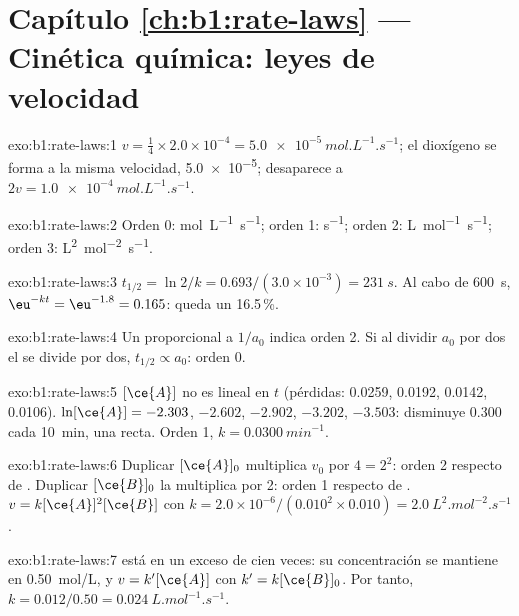 \section*{Capítulo \ref{ch:b1:rate-laws} --- Cinética química: leyes de velocidad}

\begin{solution}{exo:b1:rate-laws:1}
$v = \frac14 \times 2.0 \times 10^{-4} = \qty{5.0e-5}{mol.L^{-1}.s^{-1}}$;
el dioxígeno se forma a la misma velocidad, \qty{5.0e-5}{}; 
desaparece a
$2v = \qty{1.0e-4}{mol.L^{-1}.s^{-1}}$.
\end{solution}

\begin{solution}{exo:b1:rate-laws:2}
Orden 0: \unit{mol.L^{-1}.s^{-1}}; orden 1: \unit{s^{-1}}; orden 2:
\unit{L.mol^{-1}.s^{-1}}; orden 3: \unit{L^2.mol^{-2}.s^{-1}}.
\end{solution}

\begin{solution}{exo:b1:rate-laws:3}
$t_{1/2} = \ln2/k = 0.693/(3.0 \times 10^{-3}) = \qty{231}{s}$. Al cabo de
\qty{600}{s}, $\eu^{-kt} = \eu^{-1.8} = 0.165$: queda un 16.5\,\%.
\end{solution}

\begin{solution}{exo:b1:rate-laws:4}
Un  proporcional a $1/a_0$ indica orden 2. Si al
dividir $a_0$ por dos el  se divide por dos,
$t_{1/2} \propto a_0$: orden 0.
\end{solution}

\begin{solution}{exo:b1:rate-laws:5}
$[\ce{A}]$ no es lineal en $t$ (pérdidas: 0.0259, 0.0192, 0.0142, 0.0106).
$\ln[\ce{A}] = -2.303$, $-2.602$, $-2.902$, $-3.202$, $-3.503$: disminuye
0.300 cada \qty{10}{min}, una recta. Orden 1, $k =
\qty{0.0300}{min^{-1}}$.
\end{solution}

\begin{solution}{exo:b1:rate-laws:6}
Duplicar $[\ce{A}]_0$ multiplica $v_0$ por $4 = 2^2$: orden 2 respecto de
. Duplicar $[\ce{B}]_0$ la multiplica por 2: orden 1 respecto de
. $v =
k[\ce{A}]^2[\ce{B}]$ con $k = 2.0 \times 10^{-6}/(0.010^2 \times 0.010) =
\qty{2.0}{L^2.mol^{-2}.s^{-1}}$.
\end{solution}

\begin{solution}{exo:b1:rate-laws:7}
 está en un exceso de cien veces: su concentración se mantiene en
\qty{0.50}{mol/L}, y $v = k'[\ce{A}]$ con $k' = k[\ce{B}]_0$. Por tanto,
$k = 0.012/0.50 = \qty{0.024}{L.mol^{-1}.s^{-1}}$.
\end{solution}


